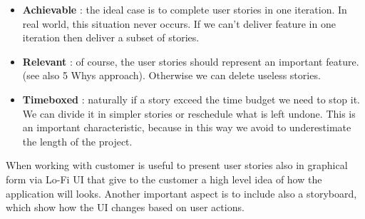 \documentclass[11pt]{article}
\begin{document}
\begin{appendix}
\begin{itemize}
\item \textbf{Achievable} : the ideal case is to complete user stories in one iteration. In real world, this situation never occurs. If we can't deliver feature in one iteration then deliver a subset of stories.
\item \textbf{Relevant} : of course, the user stories should represent an important feature. (see also 5 Whys approach). Otherwise we can delete useless stories.
\item \textbf{Timeboxed} : naturally if a story exceed the time budget we need to stop it. We can divide it in simpler stories or reschedule what is left undone. This is an important characteristic, because in this way we avoid to underestimate the length of the project.
\end{itemize}
\end{appendix}
When working with customer is useful to present user stories also in graphical form via Lo-Fi UI that give to the customer a high level idea of how the application will looks. Another important aspect is to include also a storyboard, which show how the UI changes based on user actions.
\end{document}

